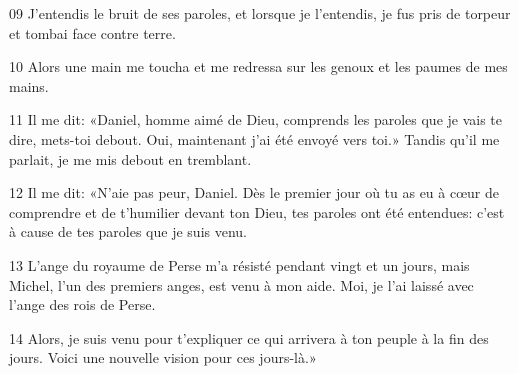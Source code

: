 
09 J’entendis le bruit de ses paroles, et lorsque je l’entendis, je fus pris de torpeur et tombai face contre terre.

10 Alors une main me toucha et me redressa sur les genoux et les paumes de mes mains.

11 Il me dit: «Daniel, homme aimé de Dieu, comprends les paroles que je vais te dire, mets-toi debout. Oui, maintenant j’ai été envoyé vers toi.» Tandis qu’il me parlait, je me mis debout en tremblant.

12 Il me dit: «N’aie pas peur, Daniel. Dès le premier jour où tu as eu à cœur de comprendre et de t’humilier devant ton Dieu, tes paroles ont été entendues: c’est à cause de tes paroles que je suis venu.

13 L’ange du royaume de Perse m’a résisté pendant vingt et un jours, mais Michel, l’un des premiers anges, est venu à mon aide. Moi, je l’ai laissé avec l’ange des rois de Perse.

14 Alors, je suis venu pour t’expliquer ce qui arrivera à ton peuple à la fin des jours. Voici une nouvelle vision pour ces jours-là.»